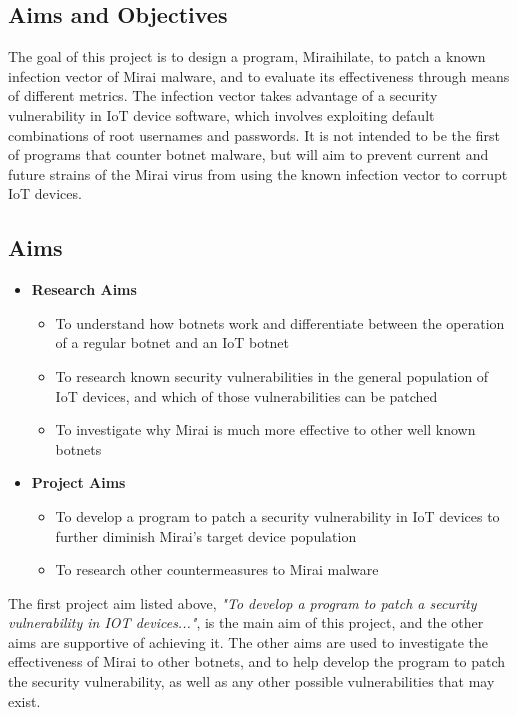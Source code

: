 \begin{flushleft}
	\section{Aims and Objectives}

	The goal of this project is to design a program, Miraihilate, to patch a known infection vector of Mirai malware, and to evaluate its effectiveness through means of different metrics. The infection vector takes advantage of a security vulnerability in IoT device software, which involves exploiting default combinations of root usernames and passwords. It is not intended to be the first of programs that counter botnet malware, but will aim to prevent current and future strains of the Mirai virus from using the known infection vector to corrupt IoT devices.

	\subsection{Aims}
	\begin{itemize}
    \item{\textbf{Research Aims}}
    \begin{itemize}
      \item{To understand how botnets work and differentiate between the operation of a regular botnet and an IoT botnet}
      \item{To research known security vulnerabilities in the general population of IoT devices, and which of those vulnerabilities can be patched}
  		\item{To investigate why Mirai is much more effective to other well known botnets}
    \end{itemize}
    \item{\textbf{Project Aims}}
  	\begin{itemize}
  		\item{To develop a program to patch a security vulnerability in IoT devices to further diminish Mirai's target device population}
      \item{To research other countermeasures to Mirai malware}
    \end{itemize}
	\end{itemize}

	The first project aim listed above, \textit{"To develop a program to patch a security vulnerability in IOT devices..."}, is the main aim of this project, and the other aims are supportive of achieving it. The other aims are used to investigate the effectiveness of Mirai to other botnets, and to help develop the program to patch the security vulnerability, as well as any other possible vulnerabilities that may exist.


\end{flushleft}

